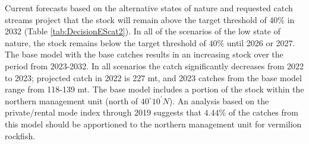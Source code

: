 \documentclass[11pt,
  english,
]{article}
\begin{document}
Current forecasts based on the alternative states of nature and requested catch streams project that the stock will remain above the target threshold of 40\% in 2032 (Table \ref{tab:DecisionEScat2}). In all of the scenarios of the low state of nature, the stock remains below the target threshold of {\(40\%\)\leavevmode\tagmcend\tagstructend} until 2026 or 2027. The base model with the base catches results in an increasing stock over the period from 2023-2032. In all scenarios the catch significantly decreases from 2022 to 2023; projected catch in 2022 is 227 mt, and 2023 catches from the base model range from 118-139 mt. The base model includes a portion of the stock within the northern management unit (north of $40^\circ 10^\prime N$). An analysis based on the private/rental mode index through 2019 suggests that {\(4.44\%\)\leavevmode\tagmcend\tagstructend} of the catches from this model should be apportioned to the northern management unit for vermilion rockfish.
\end{document}
